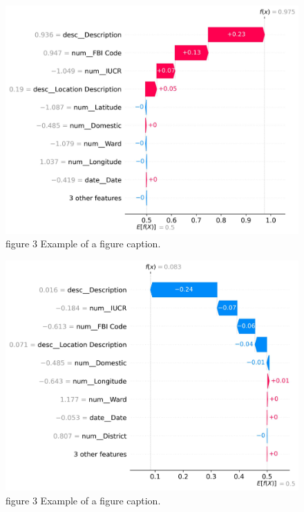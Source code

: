 \documentclass[conference]{IEEEtran}
\begin{document}
\begin{figure}[htbp]
\centerline{\includegraphics{Graphs/imbalanced_waterfall_plot/Details43.jpg}}
\caption{figure 3 Example of a figure caption.}
\label{figwaterfall3}
\end{figure}

\begin{figure}[htbp]
\centerline{\includegraphics{Graphs/imbalanced_waterfall_plot/Details1.jpg}}
\caption{figure 3 Example of a figure caption.}
\label{figwaterfall1}
\end{figure}
\end{document}
